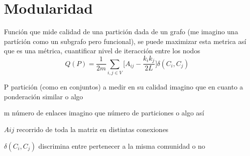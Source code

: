 \documentclass[12pt,twoside]{book}
\begin{document}
\chapter{Modularidad}

Función que mide calidad de una partición dada de un grafo (me imagino una partíción como un subgrafo pero funcional), se puede maximizar esta metrica así que es una métrica, cuantificar nivel de iteracción entre los nodos
\begin{equation}
Q(P) = \frac{1}{2m}\sum_{i,j\in V}\big[ A_{ij}-\frac{k_ik_j}{2L}\big]\delta(C_i, C_j)
\end{equation}

P partición (como en conjuntos) a medir en su calidad imagino que en cuanto a ponderación similar o algo 

m número de enlaces imagino que número de particiones o algo así 

$Aij$ recorrido de toda la matriz en distintas conexiones 

$\delta(C_i, C_j)$ discrimina entre pertenecer a la misma comunidad o no 
\end{document}
